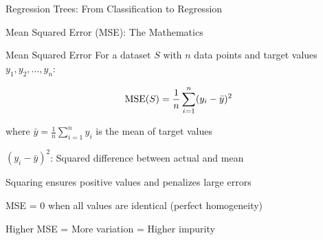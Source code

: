 \documentclass[usenames,dvipsnames]{beamer}
\begin{document}
\begin{frame}{Regression Trees: From Classification to Regression}

\end{frame}

\begin{frame}{Mean Squared Error (MSE): The Mathematics}
\begin{definitionbox}{Mean Squared Error}
For a dataset $S$ with $n$ data points and target values $y_1, y_2, \ldots, y_n$:

\vspace{0.3cm}
\[
\operatorname{MSE}(S) = \frac{1}{n} \sum_{i=1}^{n} (y_i - \bar{y})^2
\]
\vspace{0.3cm}

where $\bar{y} = \frac{1}{n} \sum_{i=1}^{n} y_i$ is the mean of target values
\end{definitionbox}
\pause
\cleanitemize
{
    \item $(y_i - \bar{y})^2$: Squared difference between actual and mean
    \item Squaring ensures positive values and penalizes large errors
    \item MSE = 0 when all values are identical (perfect homogeneity)
    \item Higher MSE = More variation = Higher impurity
}
\end{frame}
\end{document}
